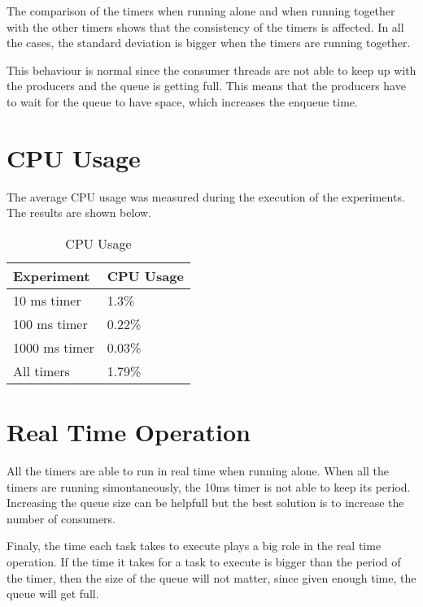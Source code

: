 \documentclass[12pt, a4paper]{report}
\begin{document}
The comparison of the timers when running alone and when running together 
with the other timers shows that the consistency of the timers is affected.
In all the cases, the standard deviation is bigger when the timers are running together.

This behaviour is normal since the consumer threads are not able to keep up with the 
producers and the queue is getting full. This means that the producers have to wait
for the queue to have space, which increases the enqueue time.

\section*{CPU Usage}

The average CPU usage was measured during the execution of the experiments. The results are shown below.

\begin{table}[H]
    \centering
    \begin{tabular}{|l|l|}
    \hline
    \textbf{Experiment} & \textbf{CPU Usage} \\ \hline
    10 ms timer         & 1.3\%              \\ \hline
    100 ms timer        & 0.22\%             \\ \hline
    1000 ms timer       & 0.03\%             \\ \hline
    All timers          & 1.79\%             \\ \hline
    \end{tabular}
    \caption{CPU Usage}
\end{table}


\section*{Real Time Operation}

All the timers are able to run in real time when running alone. When all the timers are
running simontaneously, the 10ms timer is not able to keep its period. Increasing the 
queue size can be helpfull but the best solution is to increase the number of consumers.

Finaly, the time each task takes to execute plays a big role in the real time operation.
If the time it takes for a task to execute is bigger than the period of the timer, then
the size of the queue will not matter, since given enough time, the queue will get full.
\end{document}
